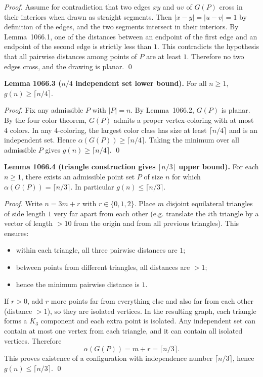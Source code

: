 \emph{Proof.}
Assume for contradiction that two edges $xy$ and $uv$ of $G(P)$ cross in their interiors when drawn as straight segments. Then $|x-y|=|u-v|=1$ by definition of the edges, and the two segments intersect in their interiors.  By Lemma~1066.1, one of the distances between an endpoint of the first edge and an endpoint of the second edge is strictly less than $1$.  This contradicts the hypothesis that all pairwise distances among points of $P$ are at least $1$.  Therefore no two edges cross, and the drawing is planar. \qed

\textbf{Lemma 1066.3 ($n/4$ independent set lower bound).}
For all $n\ge 1$, $g(n)\ge \lceil n/4\rceil$.

\emph{Proof.}
Fix any admissible $P$ with $|P|=n$. By Lemma~1066.2, $G(P)$ is planar. By the four color theorem, $G(P)$ admits a proper vertex-coloring with at most $4$ colors.  In any $4$-coloring, the largest color class has size at least $\lceil n/4\rceil$ and is an independent set. Hence $\alpha(G(P))\ge \lceil n/4\rceil$.  Taking the minimum over all admissible $P$ gives $g(n)\ge \lceil n/4\rceil$. \qed

\textbf{Lemma 1066.4 (triangle construction gives $\lceil n/3\rceil$ upper bound).}
For each $n\ge 1$, there exists an admissible point set $P$ of size $n$ for which $\alpha(G(P))=\lceil n/3\rceil$. In particular $g(n)\le \lceil n/3\rceil$.

\emph{Proof.}
Write $n=3m+r$ with $r\in\{0,1,2\}$. Place $m$ disjoint equilateral triangles of side length $1$ very far apart from each other (e.g. translate the $i$th triangle by a vector of length $>10$ from the origin and from all previous triangles). This ensures:
\begin{itemize}
\item within each triangle, all three pairwise distances are $1$;
\item between points from different triangles, all distances are $>1$;
\item hence the minimum pairwise distance is $1$.
\end{itemize}
If $r>0$, add $r$ more points far from everything else and also far from each other (distance $>1$), so they are isolated vertices.
In the resulting graph, each triangle forms a $K_3$ component and each extra point is isolated.  Any independent set can contain at most one vertex from each triangle, and it can contain all isolated vertices. Therefore
\[
\alpha(G(P)) = m + r = \lceil n/3\rceil.
\]
This proves existence of a configuration with independence number $\lceil n/3\rceil$, hence $g(n)\le \lceil n/3\rceil$. \qed

